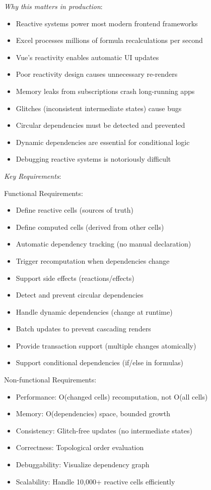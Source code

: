 \documentclass[11pt]{article}
\begin{document}
\emph{Why this matters in production}:

\begin{itemize}
\item Reactive systems power most modern frontend frameworks
\item Excel processes millions of formula recalculations per second
\item Vue's reactivity enables automatic UI updates
\item Poor reactivity design causes unnecessary re-renders
\item Memory leaks from subscriptions crash long-running apps
\item Glitches (inconsistent intermediate states) cause bugs
\item Circular dependencies must be detected and prevented
\item Dynamic dependencies are essential for conditional logic
\item Debugging reactive systems is notoriously difficult
\end{itemize}

\emph{Key Requirements}:

Functional Requirements:

\begin{itemize}
\item Define reactive cells (sources of truth)
\item Define computed cells (derived from other cells)
\item Automatic dependency tracking (no manual declaration)
\item Trigger recomputation when dependencies change
\item Support side effects (reactions/effects)
\item Detect and prevent circular dependencies
\item Handle dynamic dependencies (change at runtime)
\item Batch updates to prevent cascading renders
\item Provide transaction support (multiple changes atomically)
\item Support conditional dependencies (if/else in formulas)
\end{itemize}

Non-functional Requirements:

\begin{itemize}
\item Performance: O(changed cells) recomputation, not O(all cells)
\item Memory: O(dependencies) space, bounded growth
\item Consistency: Glitch-free updates (no intermediate states)
\item Correctness: Topological order evaluation
\item Debuggability: Visualize dependency graph
\item Scalability: Handle 10,000+ reactive cells efficiently
\end{itemize}
\end{document}
